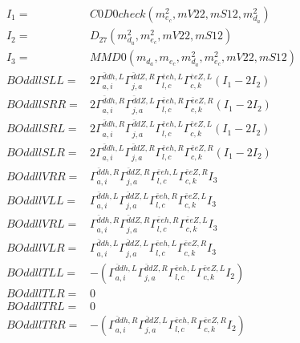 \documentclass[A4,landscape]{article}
\begin{document}
\begin{align} 
I_1 = & C0D0check(m^2_{e_{{c}}}, mV22, mS12, m^2_{d_{{a}}}) \\ 
I_2 = & D_{27}(m^2_{d_{{a}}}, m^2_{e_{{c}}}, mV22, mS12) \\ 
I_3 = & MMD0(m_{d_{{a}}}, m_{e_{{c}}}, m^2_{d_{{a}}}, m^2_{e_{{c}}}, mV22, mS12) \\ 
  BOddllSLL= & 2  \Gamma^{\bar{d}d h ,L}_{a, i} \Gamma^{\bar{d}d Z ,R}_{j, a} \Gamma^{\bar{e}e h ,L}_{l, c} \Gamma^{\bar{e}e Z ,L}_{c, k} (I_1 - 2 I_2) \\ 
  BOddllSRR= & 2  \Gamma^{\bar{d}d h ,R}_{a, i} \Gamma^{\bar{d}d Z ,L}_{j, a} \Gamma^{\bar{e}e h ,R}_{l, c} \Gamma^{\bar{e}e Z ,R}_{c, k} (I_1 - 2 I_2) \\ 
  BOddllSRL= & 2  \Gamma^{\bar{d}d h ,R}_{a, i} \Gamma^{\bar{d}d Z ,L}_{j, a} \Gamma^{\bar{e}e h ,L}_{l, c} \Gamma^{\bar{e}e Z ,L}_{c, k} (I_1 - 2 I_2) \\ 
  BOddllSLR= & 2  \Gamma^{\bar{d}d h ,L}_{a, i} \Gamma^{\bar{d}d Z ,R}_{j, a} \Gamma^{\bar{e}e h ,R}_{l, c} \Gamma^{\bar{e}e Z ,R}_{c, k} (I_1 - 2 I_2) \\ 
  BOddllVRR= &  \Gamma^{\bar{d}d h ,R}_{a, i} \Gamma^{\bar{d}d Z ,R}_{j, a} \Gamma^{\bar{e}e h ,L}_{l, c} \Gamma^{\bar{e}e Z ,R}_{c, k} I_3 \\ 
  BOddllVLL= &  \Gamma^{\bar{d}d h ,L}_{a, i} \Gamma^{\bar{d}d Z ,L}_{j, a} \Gamma^{\bar{e}e h ,R}_{l, c} \Gamma^{\bar{e}e Z ,L}_{c, k} I_3 \\ 
  BOddllVRL= &  \Gamma^{\bar{d}d h ,R}_{a, i} \Gamma^{\bar{d}d Z ,R}_{j, a} \Gamma^{\bar{e}e h ,R}_{l, c} \Gamma^{\bar{e}e Z ,L}_{c, k} I_3 \\ 
  BOddllVLR= &  \Gamma^{\bar{d}d h ,L}_{a, i} \Gamma^{\bar{d}d Z ,L}_{j, a} \Gamma^{\bar{e}e h ,L}_{l, c} \Gamma^{\bar{e}e Z ,R}_{c, k} I_3 \\ 
  BOddllTLL= & -( \Gamma^{\bar{d}d h ,L}_{a, i} \Gamma^{\bar{d}d Z ,R}_{j, a} \Gamma^{\bar{e}e h ,L}_{l, c} \Gamma^{\bar{e}e Z ,L}_{c, k} I_2) \\ 
  BOddllTLR= & 0 \\ 
  BOddllTRL= & 0 \\ 
  BOddllTRR= & -( \Gamma^{\bar{d}d h ,R}_{a, i} \Gamma^{\bar{d}d Z ,L}_{j, a} \Gamma^{\bar{e}e h ,R}_{l, c} \Gamma^{\bar{e}e Z ,R}_{c, k} I_2) \\ 
\end{align} 
\end{document}
